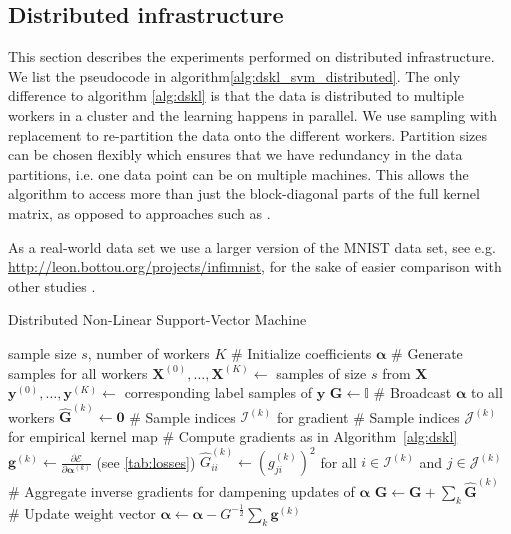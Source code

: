 \documentclass{article} %
\newcommand{\va}{\boldsymbol{\alpha}}
\renewcommand{\vec}[1]{\mathbf{#1}}
\begin{document}
\subsection{Distributed infrastructure}\label{sec:distributed}
This section describes the experiments performed on distributed infrastructure. We list the pseudocode in algorithm\autoref{alg:dskl_svm_distributed}. The only difference to algorithm \autoref{alg:dskl} is that the data is distributed to multiple workers in a cluster and the learning happens in parallel. We use sampling with replacement to re-partition the data onto the different workers. Partition sizes can be chosen flexibly which ensures that we have redundancy in the data partitions, i.e. one data point can be on multiple machines. This allows the algorithm to access more than just the block-diagonal parts of the full kernel matrix, as opposed to approaches such as \cite{Deisenroth2015}. 

As a real-world data set we use a larger version of the MNIST data set, see e.g. \url{http://leon.bottou.org/projects/infimnist}, for the sake of easier comparison with other studies \cite{Lu2014, Dai2014}.

\begin{algorithm}
  \begin{algorithmic}[1]
    \caption{Distributed Non-Linear Support-Vector Machine\label{alg:dskl_svm_distributed}}
      \REQUIRE sample size $s$, number of workers $K$
   \STATE \# Initialize coefficients $\va$
      \STATE \# Generate samples for all workers
      \STATE $\vec{X}^{(0)},\dots,\vec{X}^{(K)} \leftarrow$ samples of size $s$ from $\vec{X}$
      \STATE $\vec{y}^{(0)},\dots,\vec{y}^{(K)} \leftarrow$ corresponding label samples of $\vec{y}$
      \STATE $\vec{G} \leftarrow \mathbb{I}$
      	    \STATE \# Broadcast $\va$ to all workers
		\STATE $\hat{\vec{G}}^{(k)} \leftarrow \mathbf{0}$
		\STATE \# Sample indices $\mathcal{I}^{(k)}$ for gradient 
		\STATE \# Sample indices $\mathcal{J}^{(k)}$ for empirical kernel map
		\STATE \# Compute gradients as in Algorithm~\autoref{alg:dskl}
		\STATE $\vec{g}^{(k)} \gets \frac{\partial \mathcal{E}}{\partial\va^{(k)}}$ (see \autoref{tab:losses})
		\STATE $\hat{G}_{ii}^{(k)} \leftarrow \left(g^{(k)}_{ji}\right)^2$ for all $i \in\mathcal{I}^{(k)}$ and $j\in\mathcal{J}^{(k)}$
	    \ENDFOR
	\STATE \# Aggregate inverse gradients for dampening updates of $\va$
        	\STATE $\vec{G} \leftarrow \vec{G} + \sum_k \hat{\vec{G}}^{(k)}$     
	\STATE \# Update weight vector 
        \STATE $\va \leftarrow \va - G^{-\frac{1}{2}} \sum_k \vec{g}^{(k)}$
      \ENDWHILE
  \end{algorithmic}
\end{algorithm}
\end{document}

